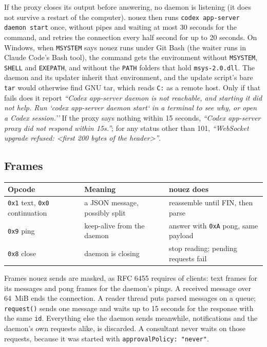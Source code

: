 \documentclass[10pt,a4paper]{article}
\newcommand{\code}[1]{\texttt{#1}}
\begin{document}
If the proxy closes its output before answering, no daemon is listening (it does not survive a
restart of the computer). nouez then runs \code{codex app-server daemon start} once, without
pipes and waiting at most 30 seconds for the command, and retries the connection every half
second for up to 20 seconds. On Windows, when \code{MSYSTEM} says nouez runs under Git Bash (the
waiter runs in Claude Code's Bash tool), the command gets the environment without \code{MSYSTEM},
\code{SHELL} and \code{EXEPATH}, and without the \code{PATH} folders that hold \code{msys-2.0.dll}.
The daemon and its updater inherit that environment, and the update script's bare \code{tar} would
otherwise find GNU tar, which reads \code{C:} as a remote host. Only if that fails does it report \emph{``Codex app-server daemon is
not reachable, and starting it did not help. Run `codex app-server daemon start` in a terminal to
see why, or open a Codex session.''} If the proxy
says nothing within 15 seconds, \emph{``Codex app-server proxy did not respond within 15s.''}; for
any status other than 101, \emph{``WebSocket upgrade refused: <first 200 bytes of the header>''}.

\subsection{Frames}

\begin{center}\small
\begin{tabular}{@{}l l l@{}}
\toprule
\textbf{Opcode} & \textbf{Meaning} & \textbf{nouez does} \\
\midrule
\code{0x1} text, \code{0x0} continuation & a JSON message, possibly split & reassemble until FIN, then parse \\
\code{0x9} ping & keep-alive from the daemon & answer with \code{0xA} pong, same payload \\
\code{0x8} close & daemon is closing & stop reading; pending requests fail \\
\bottomrule
\end{tabular}
\end{center}

Frames nouez sends are masked, as RFC 6455 requires of clients: text frames for its messages and
pong frames for the daemon's pings. A received message over 64~MiB ends the connection. A reader
thread puts parsed messages on a queue; \code{request()} sends one message and waits up to 15
seconds for the response with the same \code{id}. Everything else the daemon sends meanwhile,
notifications and the daemon's own requests alike, is discarded. A consultant never waits on
those requests, because it was started with \code{approvalPolicy: "never"}.
\end{document}
